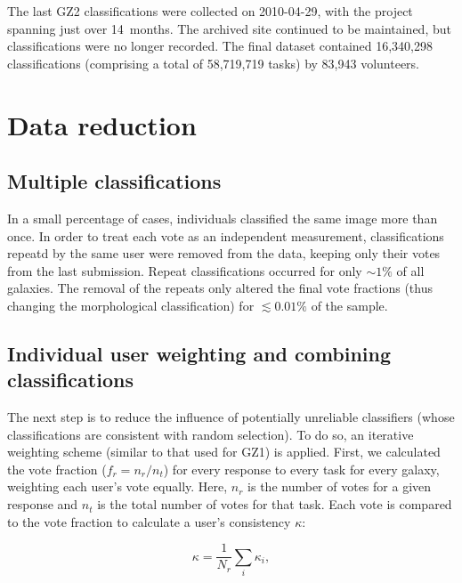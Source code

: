 \documentclass[useAMS,usenatbib]{mn2e}
\begin{document}
The last GZ2 classifications were collected on 2010-04-29, with the project spanning just over 14~months. The archived site continued to be maintained, but classifications were no longer recorded. The final dataset contained 16,340,298 classifications (comprising a total of 58,719,719 tasks) by 83,943 volunteers.


\section{Data reduction} \label{sec-datareduction}

\subsection{Multiple classifications}
In a small percentage of cases, individuals classified the same image more than once. In order to treat each vote as an independent measurement, classifications repeatd by the same user were removed from the data, keeping only their votes from the last submission. Repeat classifications occurred for only $\sim1\%$ of all galaxies. The removal of the repeats only altered the final vote fractions (thus changing the morphological classification) for $\lesssim0.01\%$ of the sample.  

\subsection{Individual user weighting and combining classifications}\label{ssec-consistency}

The next step is to reduce the influence of potentially unreliable classifiers (whose classifications are consistent with random selection). To do so, an iterative weighting scheme (similar to that used for GZ1) is applied. First, we calculated the vote fraction ($f_r = n_{r}/n_{t}$) for every response to every task for every galaxy, weighting each user's vote equally. Here, $n_r$ is the number of votes for a given response and $n_{t}$ is the total number of votes for that task. Each vote is compared to the vote fraction to calculate a user's consistency $\kappa$:

\begin{equation}
\kappa = \frac{1}{N_r}\sum_i{\kappa_i},
\label{eqn-consistency}
\end{equation}
\end{document}
